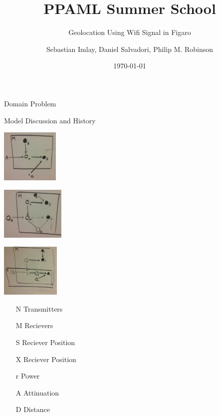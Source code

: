 \documentclass[11pt]{beamer}
\begin{document}
\title{PPAML Summer School}

\subtitle{Geolocation Using Wifi Signal in Figaro}

\author{Sebastian Imlay, Daniel Salvadori, Philip M. Robinson}


\date{\today}

\begin{frame}
  \titlepage
\end{frame}


\begin{frame}{Domain Problem}

\end{frame}

\begin{frame}{Model Discussion and History}
\begin{center}
\begin{multicols}{3}
\includegraphics[height=1in]{pictures/1plate.jpg}

\columnbreak

\includegraphics[height=1in]{pictures/2plate.jpg}

\columnbreak

\includegraphics[height=1in]{pictures/3plate.jpg}

\columnbreak
\end{multicols}
\end{center}
\begin{itemize}
\item[N] Transmitters
\item[M] Recievers
\item[S] Reciever Position
\item[X] Reciever Position
\item[r] Power
\item[A] Attinuation
\item[D] Distance
\end{itemize}

\end{frame}
\end{document}
